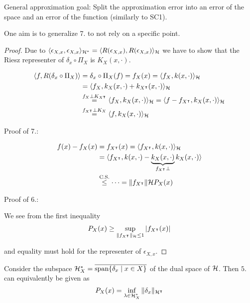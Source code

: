 \begin{aremark}
    General approximation goal: Split the approximation error into an error of the space and an error of the function (similarly to SC1).


    One aim is to generalize 7. to not rely on a specific point.
\end{aremark}

\begin{proof}
    Due to $\langle\epsilon_{X,x},\epsilon_{X,x}\rangle_{\mathcal{H}^*}=\langle R(\epsilon_{X,x}),R(\epsilon_{X,x})\rangle_{\mathcal{H}}$
    we have to show that the Riesz representer of $\delta_x\circ \Pi_X$ is $K_X(x,\cdot)$.

    \begin{align*}
        \langle f,R(\delta_x\circ\Pi_X)\rangle &= \delta_x\circ \Pi_X(f) = f_X(x)=\langle f_X,k(x,\cdot)\rangle_{\mathcal{H}}\\
        &=\langle f_X,k_X(x,\cdot)+k_{X^\intercal}(x,\cdot) \rangle_{\mathcal{H}}\\
        &\stackrel{f_X\perp K_{X^\intercal}}{=}\langle f_X,k_X(x,\cdot)\rangle_{\mathcal{H}}=\langle f-f_{X^\intercal},k_X(x,\cdot)\rangle_{\mathcal{H}}\\
        &\stackrel{f_{X^\intercal}\perp K_X}{=}\langle f,k_X(x,\cdot)\rangle_{\mathcal{H}}
    \end{align*}

    Proof of 7.:

    \begin{align*}
        f(x)-f_X(x)&=f_{X^\intercal}(x)=\langle f_{X^\intercal},k(x,\cdot) \rangle_{\mathcal{H}}\\
        &=\langle f_{X^\intercal},k(x,\cdot)-\underbrace{k_X(x,\cdot)}_{ f_{X^\intercal}\perp}k_X(x,\cdot)\rangle\\
        &\stackrel{\text{C.S.}}{\leq}\dots=\Vert f_{X^{\intercal}}\Vert\mathcal{H} P_X(x) 
    \end{align*}

    Proof of 6.:

    We see from the first inequality 
    \begin{align*}
        P_X(x)\geq \sup_{\Vert f_{X^\intercal}\Vert_{\mathcal{H}}\leq 1} |f_{X^\intercal}(x)|
    \end{align*}

    and equality must hold for the representer of $\epsilon_{X,x}$.

\end{proof}

\begin{remark}
    Consider the subspace $\mathcal{H}_X^*=\overline{\text{span}\{\delta_x\mid x\in X\}}$ of the 
    dual space of $\mathcal{H}$. Then $5.$ can equivalently be given as 
    \begin{equation}\label{eq:004}
        P_X(x)= \inf_{\lambda\in \mathcal{H}_X^*}\Vert \delta_x\Vert_{\mathcal{H}^\intercal}  
    \end{equation} 
\end{remark}


